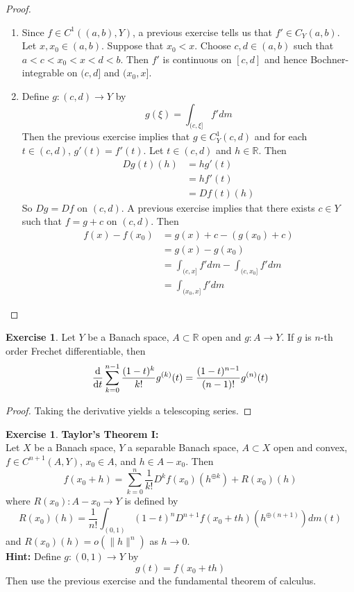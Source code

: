 \documentclass[12pt]{amsart}
\theoremstyle{definition}
\newtheorem{ex}[definition]{Exercise}
\newcommand{\R}{\mathbb{R}}
\newcommand{\tbf}[1]{\textbf{#1}}
\DeclareMathOperator*{\0}{\mbf{0}}
\DeclareMathOperator*{\1}{\mbf{1}}
\newcommand{\lex}[1]{\label{ex:#1}}
\begin{document}
	\begin{proof}\
	\begin{enumerate}
	\item Since $f \in C^1((a,b), Y)$, a previous exercise tells us that $f' \in C_Y(a,b)$. Let $x, x_0 \in (a,b)$. Suppose that $x_0 < x$. Choose $c,d \in (a,b)$ such that $a < c < x_0< x< d < b$. Then $f'$ is continuous on $[c,d]$ and hence Bochner-integrable on $(c,d]$ and $(x_0,x]$. 
	\item Define $g: (c,d) \rightarrow Y$ by $$g(\xi) = \int_{(c, \xi]}f'dm$$
	Then the previous exercise implies that $g \in C^1_Y(c,d)$ and for each $t \in (c, d)$, $g'(t) = f'(t)$. Let $t \in (c,d)$ and $h \in \R$. Then
	\begin{align*}
	Dg(t)(h) 
	&= hg'(t) \\
	&= hf'(t) \\
	&= Df(t)(h)
	\end{align*}
	So $Dg = Df$ on $(c,d)$. A previous exercise implies that there exists $c \in Y$ such that $f = g + c$ on $(c, d)$. Then 
	\begin{align*}
	f(x) - f(x_0)
	&= g(x)+c - (g(x_0)+c) \\
	&= g(x) - g(x_0) \\
	&= \int_{(c, x]}f'dm - \int_{(c, x_0]}f'dm\\
	&= \int_{(x_0, x]}f'dm
	\end{align*}
	\end{enumerate}
	\end{proof}
	
	
	\begin{ex} \lex{}
	Let $Y$ be a Banach space, $A \subset \R$ open and $g:A \rightarrow Y$. If $g$ is $n$-th order Frechet differentiable, then 
	$$\dv{t} \sum_{k=0}^{n-1} \frac{(1-t)^k}{k!}g^{(k)}(t) = \frac{(1-t)^{n-1}}{(n-1)!}g^{(n)}(t)$$
	\end{ex}
	
	\begin{proof}
	Taking the derivative yields a telescoping series.
	\end{proof}
	
	
	
	\begin{ex} \lex{} \tbf{Taylor's Theorem I:}\\
	Let $X$ be a Banach space, $Y$ a separable Banach space, $A \subset X$ open and convex, $f\in C^{n+1}(A, Y)$, $x_0 \in A$, and $h \in A - x_0$. Then $$f(x_0 + h) = \sum_{k=0}^{n} \frac{1}{k!} D^k f(x_0)(h^{\oplus k}) + R(x_0)(h)$$ 
	where $R(x_0): A - x_0 \rightarrow Y$ is defined by $$R(x_0)(h) = \frac{1}{n!}\int_{(0,1)} (1-t)^{n}D^{n+1}f(x_0 + th)(h^{\oplus (n+1)})d m(t)$$
	and $R(x_0)(h) = o(\|h\|^{n})$ as $h \rightarrow 0$.\\
	\tbf{Hint:} Define $g: (0,1) \rightarrow Y$ by $$g(t) = f(x_0 +t h)$$ Then use the previous exercise and the fundamental theorem of calculus.
	\end{ex}
	
\end{document}
